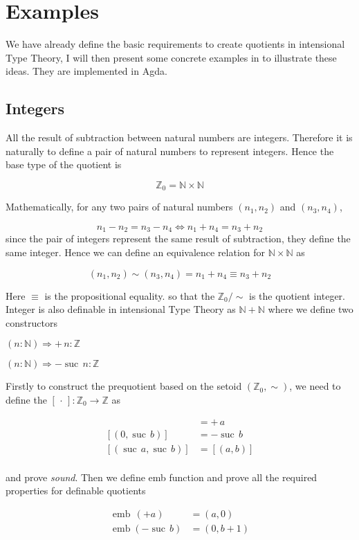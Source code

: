 \documentclass[envcountsame]{llncs}
\newcommand{\N}{\mathbb{N}}
\newcommand{\Z}{\mathbb{Z}}
\newcommand{\dotph}{\,\cdot\,}
\providecommand{\class}[1]{[#1]}
\DeclareMathOperator{\emb}{emb}
\DeclareMathOperator{\suc}{suc\,}
\begin{document}
\section{Examples}
We have already define the basic requirements to create quotients in intensional Type Theory, I will then present some concrete examples in \cite{nuo:10} to illustrate these ideas. They are implemented in Agda. 

\subsection{Integers}


All the result of subtraction between natural numbers are integers. Therefore it is naturally to define a pair of
natural numbers to represent integers. Hence the base type of the quotient is

$$\Z_0=\N \times \N$$

Mathematically, for any two pairs of natural numbers $(n_1, n_2)$ and $(n_3, n_4)$, 

$$ n_1 - n_2 = n_3 - n_4\iff n_1 + n_4 = n_3 + n_2$$
since the pair of integers represent the same result of subtraction, they define the same integer. Hence we can define an equivalence relation for $\N \times \N$ as

\[ (n_1, n_2) \sim (n_3, n_4) = n_1 + n_4 \equiv n_3 + n_2 
 \]


Here $\equiv$ is the propositional equality. so that the $\Z_0/\sim$ is the quotient integer.
Integer is also definable in intensional Type Theory as $\N+\N$ where we define two constructors

$ (n \colon \N) \Rightarrow + \,n \colon\Z$

$ (n \colon \N) \Rightarrow -\suc n \colon\Z$


Firstly to construct the prequotient based on the setoid $(\Z_0,\sim)$, we need to define the $\class\dotph \colon \Z_0 \to \Z$ as

\begin{align*}
\class{(a,0)} &= +\,a\\
\class{(0,\suc b)} &= -\suc b\\
\class{(\suc a,\suc b)} &= \class{(a,b)}\\
\end{align*}

and prove \emph{sound}. Then we define emb function and prove all the required properties for definable quotients


\begin{align*}
\emb \,(+ a) &= (a,0)\\
\emb (-\suc b) &= (0,b+1)\\
\end{align*}
\end{document}
